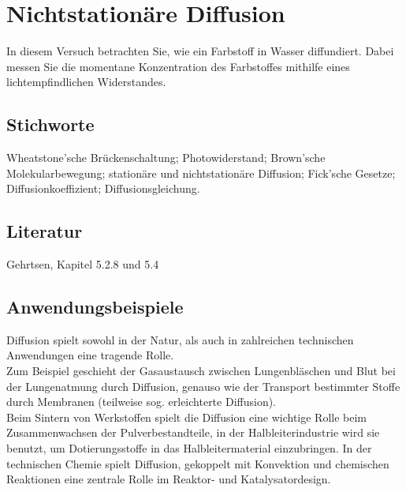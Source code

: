 \chapter{Nichtstationäre Diffusion}
\label{v:14}


In diesem Versuch betrachten Sie, wie ein Farbstoff in Wasser diffundiert. Dabei messen Sie die momentane Konzentration des Farbstoffes mithilfe eines lichtempfindlichen Widerstandes.

\section{Stichworte}

Wheatstone'sche Brückenschaltung; Photowiderstand; Brown'sche Molekularbewegung; stationäre und nichtstationäre Diffusion; Fick'sche Gesetze; Diffusionkoeffizient; Diffusionsgleichung.
%
\section{Literatur}

Gehrtsen, Kapitel 5.2.8 und 5.4
%
\section{Anwendungsbeispiele}

Diffusion spielt sowohl in der Natur, als auch in zahlreichen technischen Anwendungen eine tragende Rolle.\\
Zum Beispiel geschieht der Gasaustausch zwischen Lungenbläschen und Blut bei der Lungenatmung durch Diffusion, genauso wie der Transport bestimmter Stoffe durch Membranen (teilweise sog. erleichterte Diffusion). \\
Beim Sintern von Werkstoffen spielt die Diffusion eine wichtige Rolle beim Zusammenwachsen der Pulverbestandteile, in der Halbleiterindustrie wird sie benutzt, um Dotierungsstoffe in das Halbleitermaterial einzubringen. In der technischen Chemie spielt Diffusion, gekoppelt mit Konvektion und chemischen Reaktionen eine zentrale Rolle im Reaktor- und Katalysatordesign.

